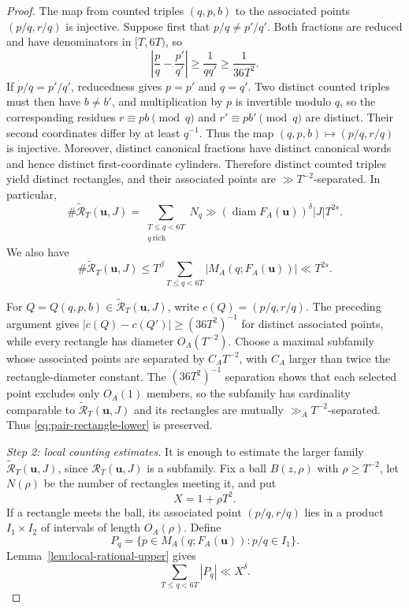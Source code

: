\documentclass[10pt,a4paper]{amsart}
\newcommand{\diam}{\operatorname{diam}}
\begin{document}
\begin{proof}
The map from counted triples $(q,p,b)$ to the associated points $(p/q,r/q)$ is injective.
Suppose first that $p/q\ne p'/q'$.  Both fractions are reduced and have
denominators in $[T,6T)$, so
$$
 \left|\frac pq-\frac{p'}{q'}\right|\ge\frac1{qq'}\ge\frac1{36T^2}.
$$
If $p/q=p'/q'$, reducedness gives $p=p'$ and $q=q'$.  Two distinct counted
triples must then have $b\ne b'$, and multiplication by $p$ is invertible modulo
$q$, so the corresponding residues $r\equiv pb\pmod q$ and
$r'\equiv pb'\pmod q$ are distinct.  Their second coordinates differ by
at least $q^{-1}$.  Thus the map $(q,p,b)\mapsto(p/q,r/q)$ is injective.  Moreover, distinct
canonical fractions have distinct canonical words and hence distinct
first-coordinate cylinders.  Therefore distinct counted triples yield distinct
rectangles, and their associated points are $\gg T^{-2}$-separated.
In particular,
$$
 \#\widetilde{\mathcal R}_T(\mathbf{u},J)
 =\sum_{\substack{T\le q<6T\\q\ \mathrm{rich}}}N_q
 \gg (\diam F_A(\mathbf{u}))^\delta |J|T^{2s}.
$$
We also have
\begin{equation}\label{eq:pair-total-upper}
 \#\widetilde{\mathcal R}_T(\mathbf{u},J)
 \le T^\beta\sum_{T\le q<6T}|M_A(q;F_A(\mathbf{u}))|
 \ll T^{2s}.
\end{equation}

For $Q=Q(q,p,b)\in\widetilde{\mathcal R}_T(\mathbf{u},J)$, write
$c(Q)=(p/q,r/q)$.  The preceding argument gives
$|c(Q)-c(Q')|\ge (36T^2)^{-1}$ for distinct associated points, while every
rectangle has diameter $O_A(T^{-2})$.  Choose a maximal subfamily whose
associated points are separated by $C_AT^{-2}$, with $C_A$ larger than twice
the rectangle-diameter constant.  The $(36T^2)^{-1}$ separation shows that
each selected point excludes only $O_A(1)$ members, so the subfamily has
cardinality comparable to $\widetilde{\mathcal R}_T(\mathbf{u},J)$ and its
rectangles are mutually $\gg_A T^{-2}$-separated.  Thus
\eqref{eq:pair-rectangle-lower} is preserved.

\medskip
\noindent\emph{Step 2: local counting estimates.}
It is enough to estimate the larger family
$\widetilde{\mathcal R}_T(\mathbf{u},J)$, since $\mathcal R_T(\mathbf{u},J)$ is a subfamily.
Fix a ball
$B(z,\rho)$ with $\rho\ge T^{-2}$, let $N(\rho)$ be the number of rectangles
meeting it, and put
$$
 X=1+\rho T^2.
$$
If a rectangle meets the ball, its associated point $(p/q,r/q)$ lies in a product $I_1\times I_2$
of intervals of length $O_A(\rho)$.  Define
$$
 P_q=\{p\in M_A(q;F_A(\mathbf{u})):p/q\in I_1\}.
$$
Lemma~\ref{lem:local-rational-upper} gives
\begin{equation}\label{eq:local-p-mass}
 \sum_{T\le q<6T}|P_q|\ll X^\delta.
\end{equation}


\end{proof}
\end{document}
